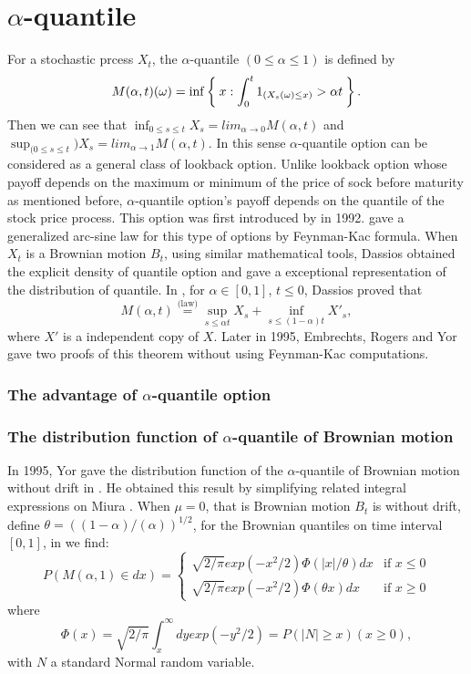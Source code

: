 \documentclass[11pt]{book}
\def\eqlaw{{\stackrel{\text{(law)}}{=}}}
\begin{document}
\chapter{$\alpha$-quantile}
For a stochastic prcess $X_t$,
the $\alpha$-quantile $( 0 \leq \alpha \leq 1)$
is defined by
\[
M(\alpha,t)(\omega) = \inf\Set{x:\int_0^t 1_{(X_s (\omega)\leq x)} > \alpha t}.
\]
Then we can see that $\inf_{0\leq s \leq t}  X_s = lim_{\alpha\to 0}M(\alpha,t)$ and $\sup_{(0\leq s \leq t})  X_s = lim_{\alpha\to 1} M(\alpha, t)$. In this sense $\alpha$-quantile option can be considered as a general class of lookback option. Unlike lookback option whose payoff depends on the maximum or minimum of the price of sock before maturity as mentioned before, $\alpha$-quantile option's payoff depends on the quantile of the stock price process. This option was first introduced by \cite{Miura} in 1992. \cite{Akahori1995} gave a generalized arc-sine law for this type of options by Feynman-Kac formula.
When $X_{t}$ is a Brownian motion $B_t$, using similar mathematical tools, Dassios obtained the explicit density of quantile option and gave a exceptional representation of the distribution of quantile.  In \cite{Dassios1995}, for $\alpha\in[0,1]$, $t\leq 0$, Dassios proved that
\begin{equation}\label{eq:Dassios}
M(\alpha, t) \eqlaw \sup_{s \leq \alpha t} X_s + \inf_{s\leq (1-\alpha)t} X'_s ,
\end{equation}
where $X'$ is a independent copy of $X$. Later in 1995, Embrechts, Rogers and Yor \cite{EmRoge1995} gave two proofs of this theorem without using Feynman-Kac computations.
\subsection{The advantage of $\alpha$-quantile option}
\cite{Ballotta2001}
\subsection{The distribution function of $\alpha$-quantile of Brownian motion}
In 1995, Yor gave the distribution function of the $\alpha$-quantile of Brownian motion without drift in \cite{Yor1995}. He obtained this result by simplifying related integral expressions on Miura \cite{Miura}. When $\mu = 0$, that is Brownian motion $B_t$ is without drift, define $\theta = ((1 - \alpha)/(\alpha))^{1/2}$, for the Brownian quantiles on time interval $[0, 1]$,  in \cite{Yor1995} we find:
\begin{equation}
P(M(\alpha,1)\in dx)= \begin{cases}
\sqrt{2 / \pi}exp(-x^2 / 2) \Phi(|x| / \theta)dx  &  \text{if } x \leq 0 \\
\sqrt{2 / \pi}exp(-x^2 / 2) \Phi(\theta x)dx  &  \text{if } x \geq 0
\end{cases}
\end{equation}
where
\begin{equation}\label{eq:density}
\Phi (x) = \sqrt{2/ \pi} \int^{\infty}_x dy exp(-y^2 / 2) = P (|N| \geq x)     (x \geq 0),
\end{equation}
with $N$ a standard Normal random variable.
\end{document}
